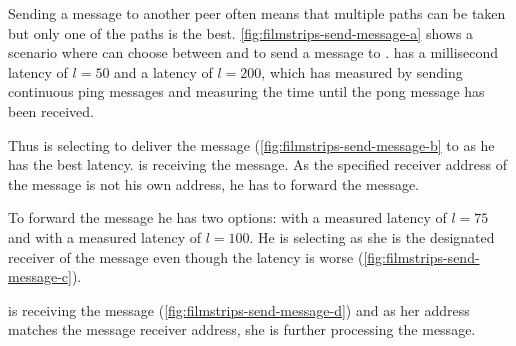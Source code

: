 Sending a message to another peer often means that multiple paths can be taken but only one of the paths is the best. \vref{fig:filmstrips-send-message-a} shows a scenario where \bob can choose between \don and \claire to send a message to \alice. \don has a millisecond latency of $l=50$ and \claire a latency of $l=200$, which \bob has measured by sending continuous ping messages and measuring the time until the pong message has been received.

Thus \bob is selecting \don to deliver the message (\vref{fig:filmstrips-send-message-b} to \alice as he has the best latency. 
\don is receiving the message. As the specified receiver address of the message is not his own address, he has to forward the message.

To forward the message he has two options: \claire with a measured latency of $l=75$ and \alice with a measured latency of $l=100$. He is selecting \alice as she is the designated receiver of the message even though the latency is worse (\vref{fig:filmstrips-send-message-c}).

\alice is receiving the message (\vref{fig:filmstrips-send-message-d}) and as her address matches the message receiver address, she is further processing the message.